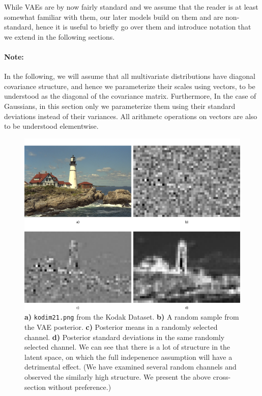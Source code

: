 \par While VAEs are by now fairly standard and we assume that the reader is at
least somewhat familiar with them, our later models build on them and are
non-standard, hence it is useful to briefly go over them and introduce
notation that we extend in the following sections.


\paragraph{Note:} In the following, we will assume that all multivariate
distributions have diagonal covariance structure, and hence we
parameterize their scales using vectors, to be understood as the diagonal of the
covariance matrix. Furthermore, In the case of Gaussians, in this section only
we parameterize them using their standard deviations instead of their variances.
All arithmetc operations on vectors are also to be understood elementwise.

\begin{figure}
  \centering
  \includegraphics[width=\textwidth]{vae_rand_posterior.png}
  \caption[Latent spaces induced by \texttt{kodim21} in our VAE.]
  {\textbf{a)} \texttt{kodim21.png} from the Kodak Dataset. \textbf{b)}
    A random sample from the VAE posterior. \textbf{c)} Posterior means in a
  randomly selected channel. \textbf{d)} Posterior standard deviations in the same
  randomly selected channel. We can see that there is a lot of structure in the
  latent space, on which the full indepenence assumption will have a detrimental
  effect. (We have examined several random channels and observed the
  similarly high structure. We present the above cross-section without preference.)}
  \label{fig:vae_rand_posterior}
\end{figure}

